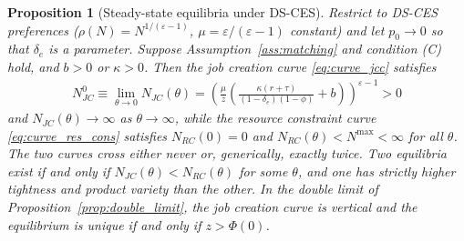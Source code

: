 \documentclass[authoryear, review, 12pt]{elsarticle}
\newtheorem{proposition}{Proposition}
\begin{document}
\begin{proposition}[Steady-state equilibria under DS-CES]
	\label{prop:equilibria}
	Restrict to DS-CES preferences ($\rho(N)=N^{1/(\varepsilon-1)}$,
	$\mu=\varepsilon/(\varepsilon-1)$ constant) and let $p_0\to 0$ so
	that $\delta_e$ is a parameter. Suppose Assumption~\ref{ass:matching} and condition (C)
	hold, and $b>0$ or $\kappa>0$. Then the job creation curve \eqref{eq:curve_jcc} satisfies
	\begin{align}\label{eq:N_JC_intercept}
		N_{JC}^0 \equiv \lim_{\theta\to 0}N_{JC}(\theta)
		= \left(\frac{\mu}{z}
		\left(\frac{\kappa(r+\tau)}{(1-\delta_e)(1-\phi)}
		+b\right)\right)^{\varepsilon-1} > 0
	\end{align}
	and $N_{JC}(\theta)\to\infty$ as $\theta\to\infty$, while the resource constraint
	curve \eqref{eq:curve_res_cons} satisfies $N_{RC}(0)=0$ and
	$N_{RC}(\theta)<N^{\max}<\infty$ for all $\theta$. The two curves cross either never or, generically,
	exactly twice. Two equilibria exist if and only if $N_{JC}(\theta)<N_{RC}(\theta)$ for
	some $\theta$, and one has strictly higher tightness and product variety than the
	other. In the double limit of Proposition~\ref{prop:double_limit}, the job creation
	curve is vertical and the equilibrium is unique if and only if $z>\Phi(0)$.
\end{proposition}
\end{document}
